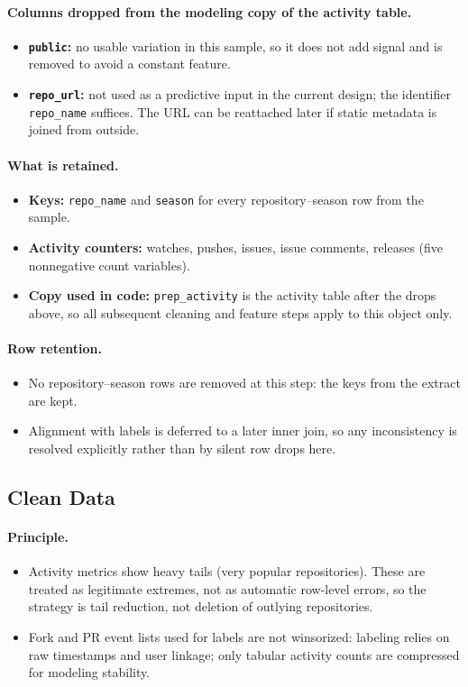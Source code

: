 \paragraph{Columns dropped from the modeling copy of the activity table.}
\begin{itemize}
  \item \textbf{\texttt{public}:} no usable variation in this sample, so it does not add signal and is removed to avoid a constant feature.
  \item \textbf{\texttt{repo\_url}:} not used as a predictive input in the current design; the identifier \texttt{repo\_name} suffices. The URL can be reattached later if static metadata is joined from outside.
\end{itemize}

\paragraph{What is retained.}
\begin{itemize}
  \item \textbf{Keys:} \texttt{repo\_name} and \texttt{season} for every repository--season row from the sample.
  \item \textbf{Activity counters:} watches, pushes, issues, issue comments, releases (five nonnegative count variables).
  \item \textbf{Copy used in code:} \texttt{prep\_activity} is the activity table after the drops above, so all subsequent cleaning and feature steps apply to this object only.
\end{itemize}

\paragraph{Row retention.}
\begin{itemize}
  \item No repository--season rows are removed at this step: the keys from the extract are kept.
  \item Alignment with labels is deferred to a later inner join, so any inconsistency is resolved explicitly rather than by silent row drops here.
\end{itemize}

\subsection{Clean Data}

\paragraph{Principle.}
\begin{itemize}
  \item Activity metrics show heavy tails (very popular repositories). These are treated as legitimate extremes, not as automatic row-level errors, so the strategy is tail reduction, not deletion of outlying repositories.
  \item Fork and PR event lists used for labels are not winsorized: labeling relies on raw timestamps and user linkage; only tabular activity counts are compressed for modeling stability.
\end{itemize}

